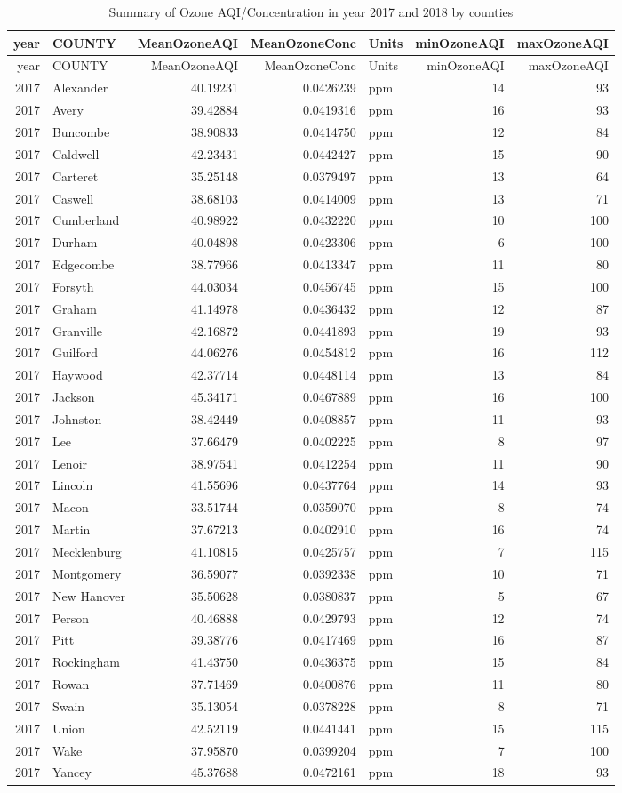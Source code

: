 \documentclass[12pt,]{article}
\begin{document}
\begin{longtable}[]{@{}rlrrlrr@{}}
\caption{Summary of Ozone AQI/Concentration in year 2017 and 2018 by
counties}\tabularnewline
\toprule
year & COUNTY & MeanOzoneAQI & MeanOzoneConc & Units & minOzoneAQI &
maxOzoneAQI\tabularnewline
\midrule
\endfirsthead
\toprule
year & COUNTY & MeanOzoneAQI & MeanOzoneConc & Units & minOzoneAQI &
maxOzoneAQI\tabularnewline
\midrule
\endhead
2017 & Alexander & 40.19231 & 0.0426239 & ppm & 14 & 93\tabularnewline
2017 & Avery & 39.42884 & 0.0419316 & ppm & 16 & 93\tabularnewline
2017 & Buncombe & 38.90833 & 0.0414750 & ppm & 12 & 84\tabularnewline
2017 & Caldwell & 42.23431 & 0.0442427 & ppm & 15 & 90\tabularnewline
2017 & Carteret & 35.25148 & 0.0379497 & ppm & 13 & 64\tabularnewline
2017 & Caswell & 38.68103 & 0.0414009 & ppm & 13 & 71\tabularnewline
2017 & Cumberland & 40.98922 & 0.0432220 & ppm & 10 & 100\tabularnewline
2017 & Durham & 40.04898 & 0.0423306 & ppm & 6 & 100\tabularnewline
2017 & Edgecombe & 38.77966 & 0.0413347 & ppm & 11 & 80\tabularnewline
2017 & Forsyth & 44.03034 & 0.0456745 & ppm & 15 & 100\tabularnewline
2017 & Graham & 41.14978 & 0.0436432 & ppm & 12 & 87\tabularnewline
2017 & Granville & 42.16872 & 0.0441893 & ppm & 19 & 93\tabularnewline
2017 & Guilford & 44.06276 & 0.0454812 & ppm & 16 & 112\tabularnewline
2017 & Haywood & 42.37714 & 0.0448114 & ppm & 13 & 84\tabularnewline
2017 & Jackson & 45.34171 & 0.0467889 & ppm & 16 & 100\tabularnewline
2017 & Johnston & 38.42449 & 0.0408857 & ppm & 11 & 93\tabularnewline
2017 & Lee & 37.66479 & 0.0402225 & ppm & 8 & 97\tabularnewline
2017 & Lenoir & 38.97541 & 0.0412254 & ppm & 11 & 90\tabularnewline
2017 & Lincoln & 41.55696 & 0.0437764 & ppm & 14 & 93\tabularnewline
2017 & Macon & 33.51744 & 0.0359070 & ppm & 8 & 74\tabularnewline
2017 & Martin & 37.67213 & 0.0402910 & ppm & 16 & 74\tabularnewline
2017 & Mecklenburg & 41.10815 & 0.0425757 & ppm & 7 & 115\tabularnewline
2017 & Montgomery & 36.59077 & 0.0392338 & ppm & 10 & 71\tabularnewline
2017 & New Hanover & 35.50628 & 0.0380837 & ppm & 5 & 67\tabularnewline
2017 & Person & 40.46888 & 0.0429793 & ppm & 12 & 74\tabularnewline
2017 & Pitt & 39.38776 & 0.0417469 & ppm & 16 & 87\tabularnewline
2017 & Rockingham & 41.43750 & 0.0436375 & ppm & 15 & 84\tabularnewline
2017 & Rowan & 37.71469 & 0.0400876 & ppm & 11 & 80\tabularnewline
2017 & Swain & 35.13054 & 0.0378228 & ppm & 8 & 71\tabularnewline
2017 & Union & 42.52119 & 0.0441441 & ppm & 15 & 115\tabularnewline
2017 & Wake & 37.95870 & 0.0399204 & ppm & 7 & 100\tabularnewline
2017 & Yancey & 45.37688 & 0.0472161 & ppm & 18 & 93\tabularnewline

\end{longtable}
\end{document}
